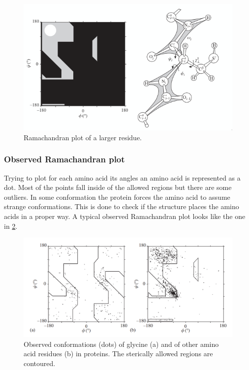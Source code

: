 	\begin{figure}[H]
		\centering
		\includegraphics[width=\textwidth]{ramachandran-final.png}
		\caption{Ramachandran plot of a larger residue.}
		\label{fig:ramachandran-final}
	\end{figure}

		\subsubsection{Observed Ramachandran plot}
		Trying to plot for each amino acid its angles an amino acid is represented as a dot.
		Most of the points fall inside of the allowed regions but there are some outliers.
		In some conformation the protein forces the amino acid to assume strange conformations.
		This is done to check if the structure places the amino acids in a proper way.
		A typical observed Ramachandran plot looks like the one in \ref{fig:ala_gly}.

		\begin{figure}[H]
			\centering
			\includegraphics[width=\textwidth]{ala_gly.png}
			\caption{Observed conformations (dots) of glycine (a) and of other amino acid residues (b) in proteins. The sterically allowed regions are contoured.}
			\label{fig:ala_gly}
		\end{figure}


